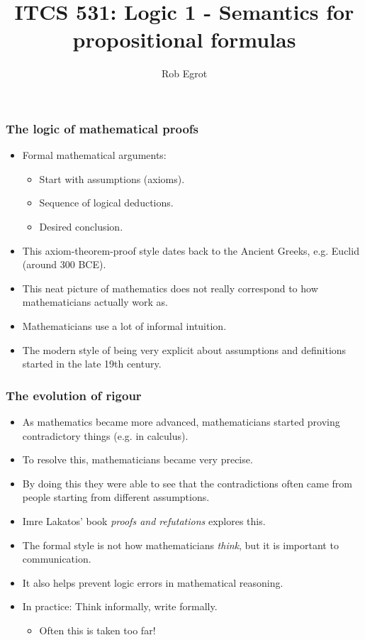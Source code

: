 \documentclass[handout]{beamer}
\title{ITCS 531: Logic 1 - Semantics for propositional formulas}
\date{}
\author{Rob Egrot}
\begin{document}
\begin{frame}
\titlepage
\end{frame}

\begin{frame}
\frametitle{The logic of mathematical proofs}
\begin{itemize}
\item Formal mathematical arguments: 
\begin{itemize}
\item Start with assumptions (axioms). 
\item Sequence of logical deductions.
\item Desired conclusion. 
\end{itemize}
\vspace{0.2cm}
\item This axiom-theorem-proof style dates back to the Ancient Greeks, e.g. Euclid (around 300 BCE). 
\vspace{0.2cm}
\item This neat picture of mathematics does not really correspond to how mathematicians actually work as.
\vspace{0.2cm}
\item Mathematicians use a lot of informal intuition. 
\vspace{0.2cm}
\item The modern style of being very explicit about assumptions and definitions started in the late 19th century.
\end{itemize}
\end{frame}

\begin{frame}
\frametitle{The evolution of rigour}
\begin{itemize}
\item As mathematics became more advanced, mathematicians started proving contradictory things (e.g. in calculus). 
\vspace{0.2cm}
\item To resolve this, mathematicians became very precise. 
\vspace{0.2cm}
\item By doing this they were able to see that the contradictions often came from people starting from different assumptions.
\vspace{0.2cm}
\item Imre Lakatos' book \emph{proofs and refutations} explores this.
\vspace{0.2cm}
\item The formal style is not how mathematicians \emph{think}, but it is important to communication. 
\vspace{0.2cm}
\item It also helps prevent logic errors in mathematical reasoning. 
\vspace{0.2cm}
\item In practice: Think informally, write formally.
\begin{itemize}
\item Often this is taken too far!
\end{itemize}
\end{itemize}
\end{frame}
\end{document}
